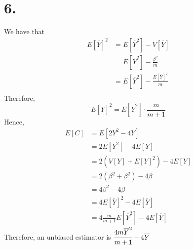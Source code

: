 \documentclass[11pt]{article}
\begin{document}
\section*{6.}
We have that
\begin{equation*}
    \begin{aligned}
        E[\overline{Y}]^2
        & = E[\overline{Y}^2] - V[\overline{Y}] \\
        & = E[\overline{Y}^2] -  \frac{\beta^2}{m} \\
        & = E[\overline{Y}^2] -  \frac{E[\overline{Y}]^2}{m} \\
    \end{aligned}
\end{equation*}
Therefore,
\[
    E[\overline{Y}]^2 = E[\overline{Y}^2] \cdot \frac{m}{m+1}
\]
Hence,
\begin{equation*}
    \begin{aligned}
        E[C] &= E[2Y^2 - 4Y] \\
        & = 2E[Y^2] - 4E[Y] \\
        & = 2(V[Y] +E[Y]^2) - 4E[Y] \\
        & = 2(\beta^2 + \beta^2) - 4 \beta \\
        & = 4\beta^2 - 4\beta \\
        & = 4E[\overline{Y}]^2 - 4 E[\overline{Y}] \\
        & = 4 \frac{m}{m+1} E[\overline{Y}^2] - 4E[\overline{Y}]
    \end{aligned}
\end{equation*}
Therefore, an unbiased estimator is $\cfrac{4m \overline{Y}^2}{m+1} - 4\overline{Y}$
\pagebreak
\end{document}
